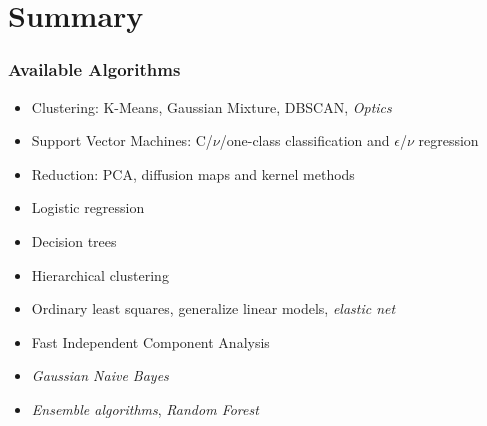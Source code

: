 \documentclass[xcolor=x11names,compress]{beamer}
\begin{document}
\section{Summary}

\begin{frame}
    \frametitle{Available Algorithms}

    \begin{itemize}
        \item<1-> Clustering: K-Means, Gaussian Mixture, DBSCAN, \textit{Optics}
        \item<2-> Support Vector Machines: C/$\nu$/one-class classification and $\epsilon$/$\nu$ regression
        \item<3-> Reduction: PCA, diffusion maps and kernel methods
        \item<4-> Logistic regression
        \item<5-> Decision trees
        \item<6-> Hierarchical clustering
        \item<7-> Ordinary least squares, generalize linear models, \textit{elastic net}
        \item<8-> Fast Independent Component Analysis
        \item<9-> \textit{Gaussian Naive Bayes}
        \item<10-> \textit{Ensemble algorithms}, \textit{Random Forest}
    \end{itemize}
\end{frame}
\end{document}
